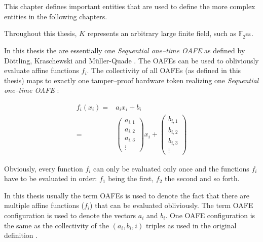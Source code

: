%
%
\label{sec:rae-definitions}

This chapter defines important entities that are used to define the more complex
entities in the following chapters.

\label{sec:field}

\label{def:field} Throughout this thesis, $K$ represents an arbitrary large
finite field, such as $\mathbb{F}_{2^{256}}$.





In this thesis the  are
essentially one \emph{Sequential one--time OAFE} as defined by Döttling,
Kraschewski and Müller-Quade \cite{davidgoliath}. The OAFEs can be used to
obliviously evaluate affine functions $f_i$. The collectivity of all OAFEs (as
defined in this thesis) maps to exactly one tamper--proof hardware token
realizing one \emph{Sequential one--time OAFE} \cite{davidgoliath}:

\begin{align*}
  f_i(x_i) = &
  a_ix_i + b_i \\
%
  = &
\begin{pmatrix}a_{i,1}\\a_{i,2}\\a_{i,3}\\\vdots\end{pmatrix}x_i +
\begin{pmatrix}b_{i,1}\\b_{i,2}\\b_{i,3}\\\vdots\end{pmatrix}
\end{align*}

\noindent{}Obviously, every function $f_i$ can only be evaluated only once and
the functions $f_i$ have to be evaluated in order: $f_1$ being the first, $f_2$
the second and so forth.

In this thesis usually the term OAFEs is used to denote the fact that there are
multiple affine functions ($f_i$) that can be evaluated obliviously. The term
OAFE configuration is used to denote the vectors $a_i$ and $b_i$. One OAFE
configuration is the same as the collectivity of the $(a_i, b_i, i)$ triples as
used in the original definition \cite{davidgoliath}.


